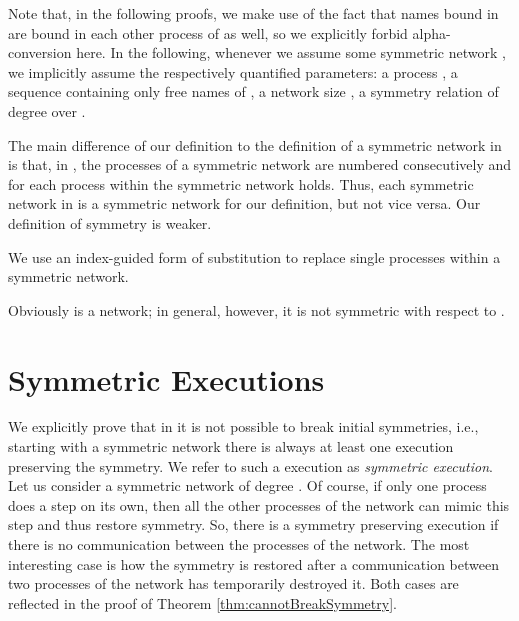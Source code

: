\documentclass[11pt,techReport]{eptcs}
\begin{document}
\noindent
Note that, in the following proofs, we make use of the fact that names bound in  are bound in each other process of  as well, so we explicitly forbid alpha-conversion here. In the following, whenever we assume some symmetric network , we implicitly assume the respectively quantified parameters: a process , a sequence  containing only free names of , a network size , a symmetry relation  of degree  over .

The main difference of our definition to the definition of a symmetric network in \cite{palamidessi03} is that, in \cite{palamidessi03}, the processes of a symmetric network are numbered consecutively and for each process  within the symmetric network  holds.  Thus, each symmetric network in \cite{palamidessi03} is a symmetric network for our definition, but not vice versa. Our definition of symmetry is weaker.



We use an index-guided form of substitution to replace single processes within a symmetric network.

\noindent
Obviously  is a network; in general, however, it is not symmetric with respect to .

\section{Symmetric Executions} \label{sec:breakingSymmetry}

We explicitly prove that in \pisep it is not possible to break initial symmetries, i.e., starting with a symmetric network there is always at least one execution preserving the symmetry. We  refer to such a execution as \emph{symmetric execution}. Let us consider a symmetric network  of degree . Of course, if only one process does a step on its own, then all the other processes of the network can mimic this step and thus restore symmetry. So, there is a symmetry preserving execution if there is no communication between the processes of the network. The most interesting case is how the symmetry is restored after a communication between two processes of the network has temporarily destroyed it. Both cases are reflected in the proof of Theorem \ref{thm:cannotBreakSymmetry}.
\end{document}
